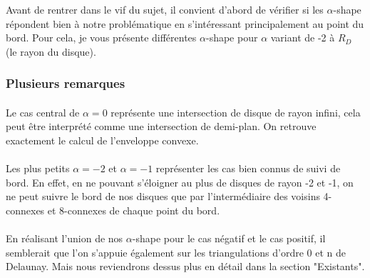 Avant de rentrer dans le vif du sujet, il convient d'abord de vérifier si les $\alpha$-shape répondent bien à notre problématique en s'intéressant principalement au point du bord. Pour cela, je vous présente différentes $\alpha$-shape pour $\alpha$ variant de -2 à $R_D$ (le rayon du disque).


\subsubsection{Plusieurs remarques}

\paragraph{}
Le cas central de $\alpha = 0$ représente une intersection de disque de rayon infini, cela peut être interprété comme une intersection de demi-plan. On retrouve exactement le calcul de l'enveloppe convexe.

\paragraph{}
Les plus petits $\alpha = -2$ et $\alpha = -1$ représenter les cas bien connus de suivi de bord. En effet, en ne pouvant s'éloigner au plus de disques de rayon -2 et -1, on ne peut suivre le bord de nos disques que par l'intermédiaire des voisins 4-connexes et 8-connexes de chaque point du bord.

\paragraph{}
En réalisant l'union de nos $\alpha$-shape pour le cas négatif et le cas positif, il semblerait que l'on s'appuie également sur les triangulations d'ordre 0 et n de Delaunay. Mais nous reviendrons dessus plus en détail dans la section "Existants".\\

